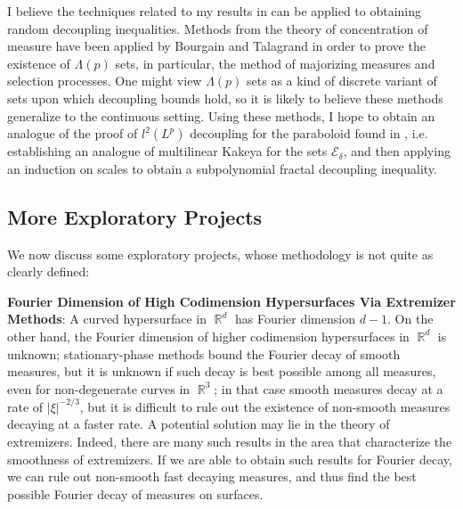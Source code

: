 \documentclass[11pt]{article}
\DeclareMathOperator{\RR}{\mathbb{R}}
\begin{document}
I believe the techniques related to my results in \cite{DensonFourier} can be applied to obtaining random decoupling inequalities. Methods from the theory of concentration of measure have been applied by Bourgain \cite{Bourgain} and Talagrand \cite{Talagrand} in order to prove the existence of $\Lambda(p)$ sets, in particular, the method of majorizing measures and selection processes. One might view $\Lambda(p)$ sets as a kind of discrete variant of sets upon which decoupling bounds hold, so it is likely to believe these methods generalize to the continuous setting. Using these methods, I hope to obtain an analogue of the proof of $l^2(L^p)$ decoupling for the paraboloid found in \cite{BourgainDemeterStudyGuide}, i.e. establishing an analogue of multilinear Kakeya for the sets $\mathcal{E}_\delta$, and then applying an induction on scales to obtain a subpolynomial fractal decoupling inequality.

\subsection{More Exploratory Projects}

We now discuss some exploratory projects, whose methodology is not quite as clearly defined:\vspace{0.3em}

{\bf Fourier Dimension of High Codimension Hypersurfaces Via Extremizer Methods}: A curved hypersurface in $\RR^d$ has Fourier dimension $d-1$. On the other hand, the Fourier dimension of higher codimension hypersurfaces in $\RR^d$ is unknown; stationary-phase methods bound the Fourier decay of smooth measures, but it is unknown if such decay is best possible among all measures, even for non-degenerate curves in $\RR^3$; in that case smooth measures decay at a rate of $|\xi|^{-2/3}$, but it is difficult to rule out the existence of non-smooth measures decaying at a faster rate. A potential solution may lie in the theory of extremizers. Indeed, there are many such results in the area that characterize the smoothness of extremizers. If we are able to obtain such results for Fourier decay, we can rule out non-smooth fast decaying measures, and thus find the best possible Fourier decay of measures on surfaces.

\end{document}

